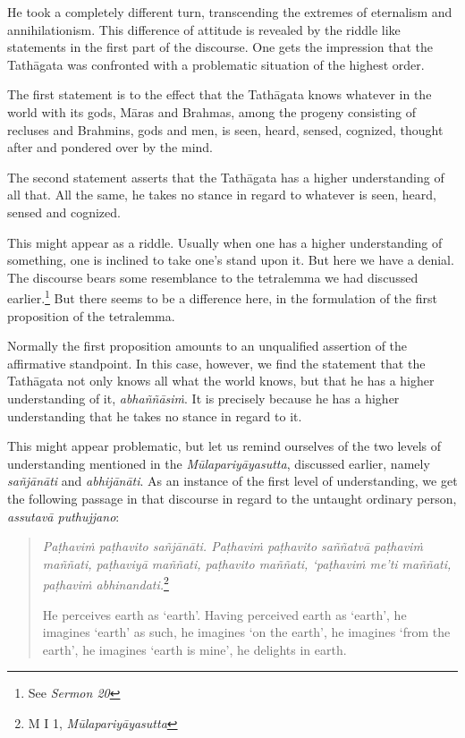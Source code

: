 He took a completely different turn, transcending the extremes of eternalism and annihilationism. This difference of attitude is revealed by the riddle like statements in the first part of the discourse. One gets the impression that the Tathāgata was confronted with a problematic situation of the highest order.

The first statement is to the effect that the Tathāgata knows whatever in the world with its gods, Māras and Brahmas, among the progeny consisting of recluses and Brahmins, gods and men, is seen, heard, sensed, cognized, thought after and pondered over by the mind.

The second statement asserts that the Tathāgata has a higher understanding of all that. All the same, he takes no stance in regard to whatever is seen, heard, sensed and cognized.

This might appear as a riddle. Usually when one has a higher understanding of something, one is inclined to take one's stand upon it. But here we have a denial. The discourse bears some resemblance to the tetralemma we had discussed earlier.\footnote{See \emph{Sermon 20}} But there seems to be a difference here, in the formulation of the first proposition of the tetralemma.

Normally the first proposition amounts to an unqualified assertion of the affirmative standpoint. In this case, however, we find the statement that the Tathāgata not only knows all what the world knows, but that he has a higher understanding of it, \emph{abhaññāsiṁ}. It is precisely because he has a higher understanding that he takes no stance in regard to it.

This might appear problematic, but let us remind ourselves of the two levels of understanding mentioned in the \emph{Mūlapariyāyasutta}, discussed earlier, namely \emph{sañjānāti} and \emph{abhijānāti}. As an instance of the first level of understanding, we get the following passage in that discourse in regard to the untaught ordinary person, \emph{assutavā puthujjano}:

\begin{quote}
\emph{Paṭhaviṁ paṭhavito sañjānāti. Paṭhaviṁ paṭhavito saññatvā paṭhaviṁ maññati, paṭhaviyā maññati, paṭhavito maññati, `paṭhaviṁ me'ti maññati, paṭhaviṁ abhinandati.}\footnote{M I 1, \emph{Mūlapariyāyasutta}}

He perceives earth as `earth'. Having perceived earth as `earth', he imagines `earth' as such, he imagines `on the earth', he imagines `from the earth', he imagines `earth is mine', he delights in earth.
\end{quote}

